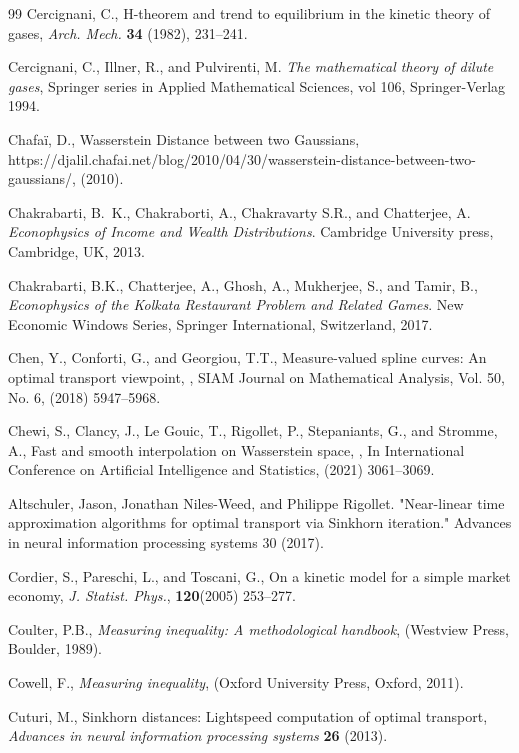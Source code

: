 \documentclass{article}
\begin{document}
\begin{thebibliography}{99}
Cercignani, C., H-theorem and trend to equilibrium in the kinetic theory of gases, \emph{Arch. Mech.} \textbf{34} (1982), 231--241.

Cercignani, C.,  Illner, R., and Pulvirenti, M. \emph{The mathematical theory of dilute gases}, Springer series in Applied Mathematical Sciences, vol 106, Springer-Verlag 1994.

 Chafa\"i, D.,  
    {Wasserstein Distance between two {G}aussians},\\
  {https://djalil.chafai.net/blog/2010/04/30/wasserstein-distance-between-two-gaussians/}, (2010).

Chakrabarti, B.~K., Chakraborti, A., Chakravarty S.R., and Chatterjee, A.
\emph{Econophysics of Income and Wealth Distributions}. Cambridge University press, Cambridge, UK,  2013.

Chakrabarti, B.K., Chatterjee, A., Ghosh, A., Mukherjee, S., and Tamir, B.,
\emph{Econophysics of the Kolkata Restaurant Problem and Related Games}. New Economic Windows Series, Springer International, Switzerland, 2017.



Chen, Y., Conforti, G., and Georgiou, T.T., Measure-valued spline curves: An optimal transport viewpoint,  , SIAM Journal on Mathematical Analysis, Vol. 50, No. 6, (2018) 5947--5968.

Chewi, S., Clancy, J., Le Gouic, T., Rigollet, P., Stepaniants, G., and Stromme, A., Fast and smooth interpolation on Wasserstein space,  , In International Conference on Artificial Intelligence and Statistics, (2021) 3061--3069.  

Altschuler, Jason, Jonathan Niles-Weed, and Philippe Rigollet. "Near-linear time approximation algorithms for optimal transport via Sinkhorn iteration." Advances in neural information processing systems 30 (2017).

Cordier, S., Pareschi, L., and Toscani, G., {On a kinetic
  model for a simple market economy},  \emph{J. Statist. Phys.}, \textbf{120}(2005) 253--277.

Coulter, P.B., \textit{Measuring inequality: A methodological handbook}, (Westview Press, Boulder,  1989).

Cowell, F., \textit{Measuring inequality}, (Oxford University Press, Oxford,   2011).

Cuturi, M., Sinkhorn distances: {L}ightspeed computation of optimal transport, \textit{Advances in neural information processing systems} \textbf{26}  (2013).


\end{thebibliography}
\end{document}
